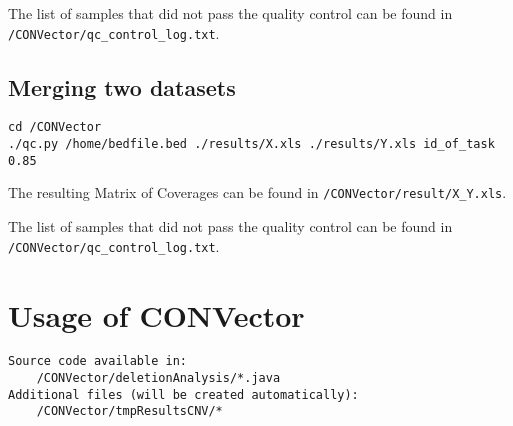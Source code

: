 \documentclass{article}
\begin{document}
The list of samples that did not pass the quality control can be found in \texttt{/CONVector/qc\_control\_log.txt}.





\subsection{Merging two datasets}

\hypertarget{mergingDatasets}{}

\begin{usecase}
\end{usecase}

\begin{lstlisting}[style=DOS, caption={How to merge Test Dataset X and Control Dataset Y}]
cd /CONVector
./qc.py /home/bedfile.bed ./results/X.xls ./results/Y.xls id_of_task 0.85
\end{lstlisting}

The resulting Matrix of Coverages can be found in \texttt{/CONVector/result/X\_Y.xls}.

The list of samples that did not pass the quality control can be found in \texttt{/CONVector/qc\_control\_log.txt}.





\newpage
\section{Usage of CONVector}
\begin{verbatim}
Source code available in:
    /CONVector/deletionAnalysis/*.java
Additional files (will be created automatically):
    /CONVector/tmpResultsCNV/*
\end{verbatim}
\end{document}
